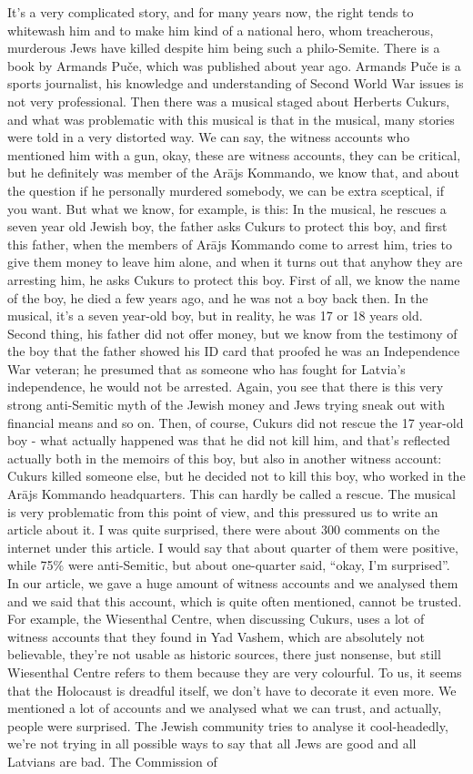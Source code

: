 It’s a very complicated story, and for many years now, the right tends to whitewash him and to make him kind of a national hero, whom treacherous, murderous Jews have killed despite him being such a philo-Semite. There is a book by Armands Puče, which was published about year ago. Armands Puče is a sports journalist, his knowledge and understanding of Second World War issues is not very professional. Then there was a musical staged about Herberts Cukurs, and what was problematic with this musical is that in the musical, many stories were told in a very distorted way. We can say, the witness accounts who mentioned him with a gun, okay, these are witness accounts, they can be critical, but he definitely was member of the Arājs Kommando, we know that, and about the question if he personally murdered somebody, we can be extra sceptical, if you want. But what we know, for example, is this: In the musical, he rescues a seven year old Jewish boy, the father asks Cukurs to protect this boy, and first this father, when the members of Arājs Kommando come to arrest him, tries to give them money to leave him alone, and when it turns out that anyhow they are arresting him, he asks Cukurs to protect this boy. First of all, we know the name of the boy, he died a few years ago, and he was not a boy back then. In the musical, it's a seven year-old boy, but in reality, he was 17 or 18 years old. Second thing, his father did not offer money, but we know from the testimony of the boy that the father showed his ID card that proofed he was an Independence War veteran; he presumed that as someone who has fought for Latvia's independence, he would not be arrested. Again, you see that there is this very strong anti-Semitic myth of the Jewish money and Jews trying sneak out with financial means and so on. Then, of course, Cukurs did not rescue the 17 year-old boy - what actually happened was that he did not kill him, and that’s reflected actually both in the memoirs of this boy, but also in another witness account: Cukurs killed someone else, but he decided not to kill this boy, who worked in the Arājs Kommando headquarters. This can hardly be called a rescue. The musical is very problematic from this point of view, and this pressured us to write an article about it. I was quite surprised, there were about 300 comments on the internet under this article. I would say that about quarter of them were positive, while 75\% were anti-Semitic, but about one-quarter said, ``okay, I'm surprised''. In our article, we gave a huge amount of witness accounts and we analysed them and we said that this account, which is quite often mentioned, cannot be trusted. For example, the Wiesenthal Centre, when discussing Cukurs, uses a lot of witness accounts that they found in Yad Vashem, which are absolutely not believable, they're not usable as historic sources, there just nonsense, but still Wiesenthal Centre refers to them because they are very colourful. To us, it seems that the Holocaust is dreadful itself, we don't have to decorate it even more. We mentioned a lot of accounts and we analysed what we can trust, and actually, people were surprised. The Jewish community tries to analyse it cool-headedly, we're not trying in all possible ways to say that all Jews are good and all Latvians are bad. The Commission of 